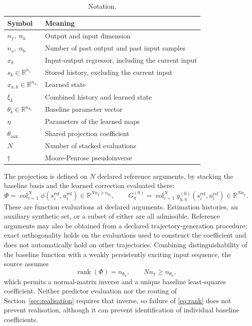 \documentclass[11pt,a4paper]{article}
\newcommand{\R}{\mathbb R}
\newcommand{\col}{\operatorname{col}}
\newcommand{\rank}{\operatorname{rank}}
\newcommand{\refset}{\mathrm{ref}}
\theoremstyle{remark}
\begin{document}
\begin{table}[ht]
\centering\small
\begin{tabular}{ll}\toprule
Symbol & Meaning\\\midrule
\(n_{\mathrm y},\ n_{\mathrm u}\) & Output and input dimension\\
\(n_{\mathrm a},\ n_{\mathrm b}\) & Number of past output and past input samples\\
\(x_k\) & Input-output regressor, including the current input\\
\(s_k\in\R^{n_s}\) & Stored history, excluding the current input\\
\(x_{a,k}\in\R^{n_{x_a}}\) & Learned state\\
\(\xi_k\) & Combined history and learned state\\
\(\theta_b\in\R^{n_{\theta_{\mathrm b}}}\) & Baseline parameter vector\\
\(\eta\) & Parameters of the learned maps\\
\(\theta_{\mathrm{aux}}\) & Shared projection coefficient\\
\(N\) & Number of stacked evaluations\\
\(\dagger\) & Moore-Penrose pseudoinverse\\
\bottomrule\end{tabular}
\caption{Notation.}\label{tab:notation}
\end{table}

The projection is defined on \(N\) declared reference arguments, by stacking the baseline basis
and the learned correction evaluated there:
\begin{equation}\label{eq:originalstacks}
\Phi=\col_{i=1}^N\phi(s_i^{\refset},u_i^{\refset})
\in\R^{Nn_{\mathrm y}\times n_{\theta_{\mathrm b}}},
\qquad
G_\eta^{(0)}=\col_{i=1}^N g_{y,\eta}^{(0)}(s_i^{\refset},u_i^{\refset})\in\R^{Nn_{\mathrm y}}.
\end{equation}
These are function evaluations at declared arguments. Estimation histories, an auxiliary
synthetic set, or a subset of either are all admissible. Reference arguments may also be obtained
from a declared trajectory-generation procedure; exact orthogonality holds on the evaluations
used to construct the coefficient and does not automatically hold on other trajectories.
Combining distinguishability of the
baseline function with a weakly persistently exciting input sequence, the source assumes
\begin{equation}\label{eq:rank}
\rank(\Phi)=n_{\theta_{\mathrm b}},\qquad Nn_{\mathrm y}\ge n_{\theta_{\mathrm b}},
\end{equation}
which permits a normal-matrix inverse and a unique baseline least-squares coefficient. Neither
predictor evaluation nor the routing of Section~\ref{sec:realisation} requires that inverse, so
failure of \eqref{eq:rank} does not prevent realisation, although it can prevent identification of
individual baseline coefficients.
\end{document}
